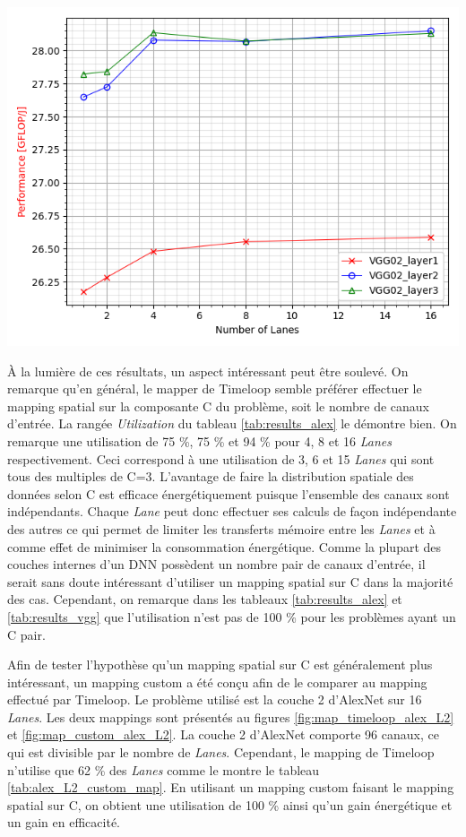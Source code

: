 \documentclass[10pt,letterpaper]{article}
\begin{document}
\begin{multicols}{2}
    {\centering
    \includegraphics[width=\linewidth]{VGG_performance.png}
    \captionsetup{hypcap=false}
    \label{fig:perf_vgg}}
    \bigskip

    À la lumière de ces résultats, un aspect intéressant peut être soulevé. On remarque qu'en général, le mapper de 
    Timeloop semble préférer effectuer le mapping spatial sur la composante C du problème, soit le nombre de canaux d'entrée.
    La rangée \textit{Utilization} du tableau \ref{tab:results_alex} le démontre bien. On remarque une utilisation de 
    75 \%, 75 \% et 94 \% pour 4, 8 et 16 \textit{Lanes} respectivement. Ceci correspond à une utilisation de 3, 6 et 15 \textit{Lanes}
    qui sont tous des multiples de C=3. L'avantage de faire la distribution spatiale des données selon C est efficace énergétiquement
    puisque l'ensemble des canaux sont indépendants. Chaque \textit{Lane} peut donc effectuer ses calculs de façon indépendante des autres
    ce qui permet de limiter les transferts mémoire entre les \textit{Lanes} et à comme effet de minimiser la consommation énergétique.
    Comme la plupart des couches internes d'un DNN possèdent un nombre pair de canaux d'entrée, il serait sans doute intéressant d'utiliser
    un mapping spatial sur C dans la majorité des cas. Cependant, on remarque dans les tableaux \ref{tab:results_alex} et \ref{tab:results_vgg} 
    que l'utilisation n'est pas de 100 \% pour les problèmes ayant un C pair.  

    Afin de tester l'hypothèse qu'un mapping spatial sur C est généralement plus intéressant, un mapping custom a été 
    conçu afin de le comparer au mapping effectué par Timeloop. Le problème utilisé est la couche 2 d'AlexNet sur 16 \textit{Lanes}.
    Les deux mappings sont présentés au figures \ref{fig:map_timeloop_alex_L2} et \ref{fig:map_custom_alex_L2}.
    La couche 2 d'AlexNet comporte 96 canaux, ce qui est divisible par le nombre de \textit{Lanes}. Cependant, le mapping 
    de Timeloop n'utilise que 62 \% des \textit{Lanes} comme le montre le tableau \ref{tab:alex_L2_custom_map}. En utilisant 
    un mapping custom faisant le mapping spatial sur C, on obtient une utilisation de 100 \% ainsi qu'un gain énergétique
    et un gain en efficacité. 


\end{multicols}
\end{document}
